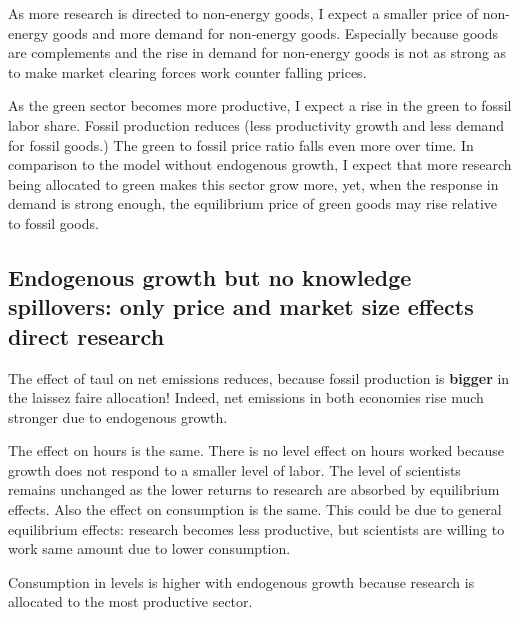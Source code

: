 \documentclass[12pt]{article}
\begin{document}
As more research is directed to non-energy goods, I expect a smaller price of non-energy goods and more demand for non-energy goods. Especially because goods are complements and the rise in demand for non-energy goods is not as strong as to make market clearing forces work counter falling prices.

As the green sector becomes more productive, I expect a rise in the green to fossil labor share. Fossil production reduces (less productivity growth and less demand for fossil goods.) The green to fossil price ratio falls even more over time. In comparison to the model without endogenous growth, I expect that more research being allocated to green makes this sector grow more, yet, when the response in demand is strong enough, the equilibrium price of green goods may rise relative to fossil goods.

\clearpage
\newpage
\subsection{Endogenous growth but no knowledge spillovers: only price and market size effects direct research}
The effect of taul on net emissions reduces, because fossil production is \textbf{bigger} in the laissez faire allocation!  Indeed, net emissions in both economies rise much stronger due to endogenous growth. 

The effect on hours is the same. There is no level effect on hours worked because growth does not respond to a smaller level of labor. The level of scientists remains unchanged as the lower returns to research are absorbed by equilibrium effects. Also the effect on consumption is the same. This could be due to general equilibrium effects: research becomes less productive, but scientists are willing to work same amount due to lower consumption. 

Consumption in levels is higher with endogenous growth because research is allocated to the most productive sector.
\end{document}
